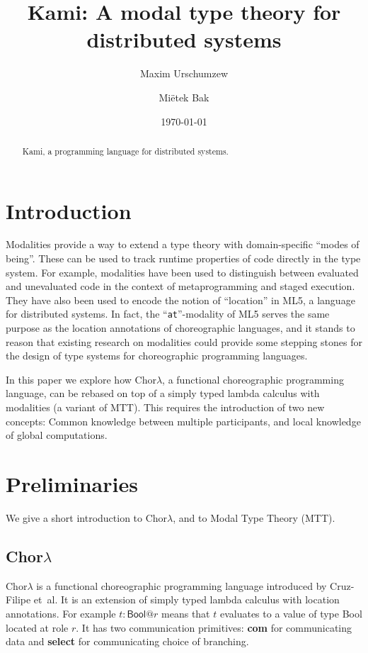\documentclass{scrartcl}
\title{Kami: A modal type theory for distributed systems}
\author{Maxim Urschumzew \and Miëtek Bak}
\date{\today}
\theoremstyle{definition}
\theoremstyle{plain}
\begin{document}
\maketitle


\newcommand{\primitive}[1]{\textsf{\textbf{#1}}}
\newcommand{\primitiveMath}[1]{\mathsf{\mathbf{#1}}}
\newcommand{\ChorMTT}{Chor${}_{\textrm{MTT}}$}
\newcommand{\onleftarrow}[1]{\mathop{\smash{\xleftarrow{#1}}}}
\newcommand{\ProcMTT}{Proc${}_{\textrm{MTT}}$}


\begin{abstract}
  Kami, a programming language for distributed systems.
\end{abstract}


\section{Introduction}
Modalities provide a way to extend a type theory with domain-specific
``modes of being''. These can be used to track runtime properties of code
directly in the type system. For example, modalities have been used to
distinguish between evaluated and unevaluated code in the context of
metaprogramming and staged execution\cite{davies2001modal}. They have also been used to encode the
notion of ``location'' in ML5\cite{murphy2008modal}, a language for distributed
systems. In fact, the ``\texttt{at}''-modality of ML5 serves the same purpose as the
location annotations of choreographic
languages\cite{cruz2022functional,giallorenzo2005object}, and it stands to
reason that existing research on modalities could provide some stepping stones
for the design of type systems for choreographic programming languages.

\medskip

In this paper we explore how Chor$\lambda$\cite{cruz2022functional}, a functional choreographic
programming language, can be rebased on top of a simply typed lambda calculus
with modalities (a variant of MTT\cite{gratzer2023syntax}).
This requires the introduction of two new concepts: Common
knowledge between multiple participants, and local knowledge of global computations.

\section{Preliminaries}
We give a short introduction to Chor$\lambda$, and to Modal Type Theory (MTT).

\subsection{Chor$\lambda$}
Chor$\lambda$\cite{cruz2022functional} is a functional choreographic programming language introduced by
Cruz-Filipe et~al. It is an extension of simply typed lambda calculus with
location annotations. For example $t :
\textsf{Bool} @ r$ means that $t$ evaluates to a value of type \textsf{Bool}
located at role $r$. It has two communication primitives: \primitive{com} for
communicating data and \primitive{select} for communicating choice of branching.
\end{document}
